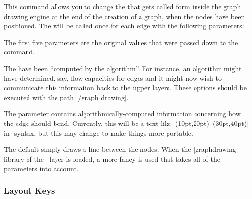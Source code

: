 \begin{command}{\pgfgdsetedgecallback{}}
  This command allows you to change the  that gets called
  form inside the graph drawing engine at the end of the creation of a
  graph, when the nodes have been positioned. The  will be 
  called once for each edge with the following parameters:
  \begin{quote}
  \end{quote}

  The first five parameters are the original values that were passed
  down to the |\pgfgdedge| command.
  
  The  have been ``computed by the
  algorithm''. For instance, an algorithm might have determined, say,
  flow capacities for edges and it might now wish to communicate this
  information back to the upper layers. These options should be
  executed with the path |/graph drawing|.
  
  The parameter  contains
  algorithmically-computed information concerning how the 
  edge should bend. Currently, this will be a text like
  |(10pt,20pt)--(30pt,40pt)| in \tikzname-syntax, but this may change
  to make things more portable.

  The default  simply draws a line between the nodes. When
  the |graphdrawing| library of the \tikzname\ layer is loaded, a more
  fancy  is used that takes all of the parameters into
  account.
\end{command}



\subsubsection{Layout Keys}

